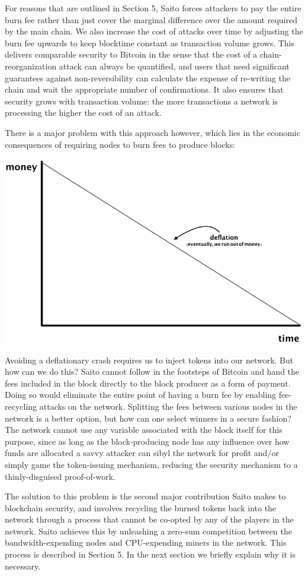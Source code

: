 \documentclass[11.5pt, oneside]{article}   	%
\begin{document}
\begin{multicols}{2}
For reasons that are outlined in Section 5, Saito forces attackers to pay the entire burn fee rather than just cover the marginal difference over the amount required by the main chain. We also increase the cost of attacks over time by adjusting the burn fee upwards to keep blocktime constant as transaction volume grows. This delivers comparable security to Bitcoin in the sense that the cost of a chain-reorganization attack can always be quantified, and users that need significant guarantees against non-reversibility can calculate the expense of re-writing the chain and wait the appropriate number of confirmations. It also ensures that security grows with transaction volume: the more transactions a network is processing the higher the cost of an attack.

There is a major problem with this approach however, which lies in the economic consequences of requiring nodes to burn fees to produce blocks:

\includegraphics[width=.45\textwidth]{saito4.jpeg}

Avoiding a deflationary crash requires us to inject tokens into our network. But how can we do this? Saito cannot follow in the footsteps of Bitcoin and hand the fees included in the block directly to the block producer as a form of payment. Doing so would eliminate the entire point of having a burn fee by enabling fee-recycling attacks on the network. Splitting the fees between various nodes in the network is a better option, but how can one select winners in a secure fashion? The network cannot use any variable associated with the block itself for this purpose, since as long as the block-producing node has any influence over how funds are allocated a savvy attacker can sibyl the network for profit and/or simply game the token-issuing mechanism, reducing the security mechanism to a thinly-disguised proof-of-work.

The solution to this problem is the second major contribution Saito makes to blockchain security, and involves recycling the burned tokens back into the network through a process that cannot be co-opted by any of the players in the network. Saito achieves this by unleashing a zero-sum competition between the bandwidth-expending nodes and CPU-expending miners in the network. This process is described in Section 5. In the next section we briefly explain why it is necessary.


\end{multicols}
\end{document}

